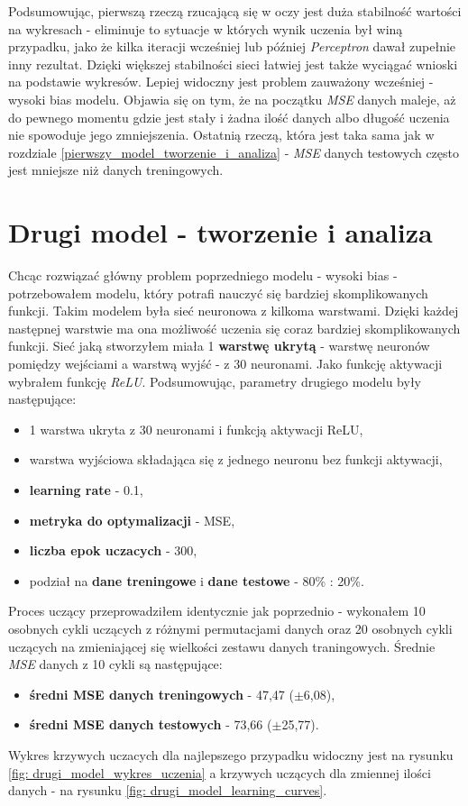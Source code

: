 \documentclass[12pt]{aghdpl}
\begin{document}
		Podsumowując, pierwszą rzeczą rzucającą się w oczy jest duża stabilność wartości na wykresach - eliminuje to sytuacje w których wynik uczenia był winą przypadku, jako że kilka iteracji wcześniej lub później \textit{Perceptron} dawał zupełnie inny rezultat. Dzięki większej stabilności sieci łatwiej jest także wyciągać wnioski na podstawie wykresów. Lepiej widoczny jest problem zauważony wcześniej - wysoki bias modelu. Objawia się on tym, że na początku \textit{MSE} danych maleje, aż do pewnego momentu gdzie jest stały i żadna ilość danych albo długość uczenia nie spowoduje jego zmniejszenia. Ostatnią rzeczą, która jest taka sama jak w rozdziale \ref{pierwszy_model_tworzenie_i_analiza} - \textit{MSE} danych testowych często jest mniejsze niż danych treningowych.
		
		\section{Drugi model - tworzenie i analiza} \label{drugi_model_tworzenie_i_analiza}
		Chcąc rozwiązać główny problem poprzedniego modelu - wysoki bias - potrzebowałem modelu, który potrafi nauczyć się bardziej skomplikowanych funkcji. Takim modelem była sieć neuronowa z kilkoma warstwami. Dzięki każdej następnej warstwie ma ona możliwość uczenia się coraz bardziej skomplikowanych funkcji. Sieć jaką stworzyłem miała 1 \textbf{warstwę ukrytą} - warstwę neuronów pomiędzy wejściami a warstwą wyjść - z 30 neuronami. Jako funkcję aktywacji wybrałem funkcję \textit{ReLU}.
		Podsumowując, parametry drugiego modelu były następujące:
		\begin{itemize}
			\item 1 warstwa ukryta z 30 neuronami i funkcją aktywacji ReLU,
			\item warstwa wyjściowa składająca się z jednego neuronu bez funkcji aktywacji,
			\item \textbf{learning rate} - 0.1,
			\item \textbf{metryka do optymalizacji} - MSE,
			\item \textbf{liczba epok uczacych} - 300,
			\item podział na \textbf{dane treningowe} i \textbf{dane testowe} - 80\% : 20\%.
		\end{itemize}
		
		Proces uczący przeprowadziłem identycznie jak poprzednio - wykonałem 10 osobnych cykli uczących z różnymi permutacjami danych oraz 20 osobnych cykli uczących na zmieniającej się wielkości zestawu danych traningowych. Średnie \textit{MSE} danych z 10 cykli są następujące:
		\begin{itemize}
		\item \textbf{średni MSE danych treningowych} - 47,47 ($\pm$6,08),
		\item \textbf{średni MSE danych testowych} - 73,66 ($\pm$25,77).
		\end{itemize}
		Wykres krzywych uczacych dla najlepszego przypadku widoczny jest na rysunku \ref{fig: drugi_model_wykres_uczenia} a krzywych uczących dla zmiennej ilości danych - na rysunku \ref{fig: drugi_model_learning_curves}.
		
\end{document}
